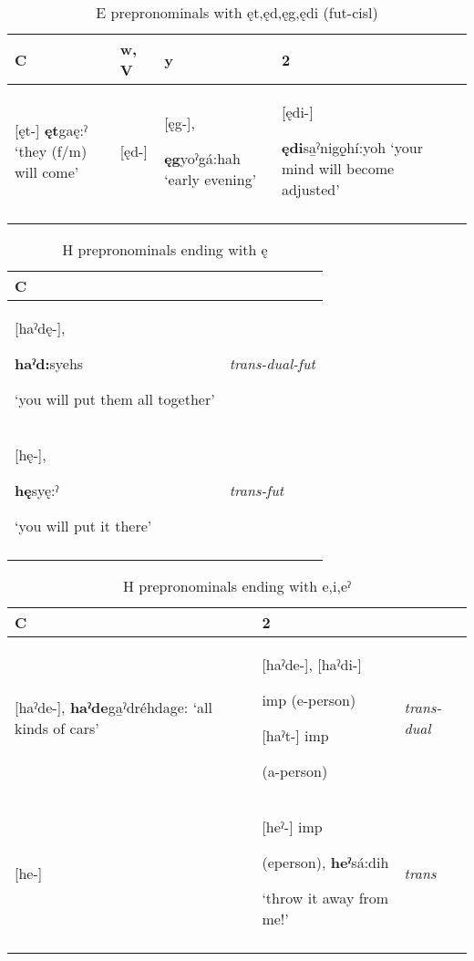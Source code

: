 \lipsum[1-1]


\begin{table}
\caption{E prepronominals with ęt,ęd,ęg,ędi (fut-cisl)}
\label{tab:1:eprepronfutcisl}
\scriptsize{
\begin{tabularx}{\textwidth}{XXXXX}
\lsptoprule
C & w, V & y & 2\\
\midrule
{}[ęt-] \textbf{ęt}gaę:ˀ ‘they (f/m) will come’ & [ęd-] & [ęg-], 

\textbf{ęg}yoˀgá:hah ‘early evening’ & [ędi-] 

\textbf{ędi}sa̱ˀnigǫ̱hí:yoh ‘your mind will become adjusted’\\
\lspbottomrule
\end{tabularx}}
\end{table}



\begin{table}
\caption{H prepronominals ending with ę}
\label{tab:1:transdualfut}
\scriptsize{
\begin{tabularx}{\textwidth}{XX}
\lsptoprule
C & \\
\midrule
{}[haˀdę-], 

\textbf{haˀd\’{ę}:}syehs 

‘you will put them all together’ & {\itshape trans-dual-fut}\\

{}[hę-], 

\textbf{hę}syę:ˀ 

‘you will put it there’ & {\itshape trans-fut}\\
\lspbottomrule
\end{tabularx}}
\end{table}



\begin{table}
\caption{H prepronominals ending with e,i,eˀ}
\label{tab:1:epreprontrans}
\scriptsize{
\begin{tabularx}{\textwidth}{XXX}
\lsptoprule
C & 2\\
\midrule
{}[haˀde-], \textbf{haˀde}ga̱ˀdréhdage: ‘all kinds of cars’ & [haˀde-], [haˀdi-]

imp (e-person) 

{}[haˀt-] imp 

(a-person) & {\itshape trans-dual}\\

{}[he-] & [heˀ-] imp 

(eperson), \textbf{heˀ}sá:dih 

‘throw it away from me!’ & {\itshape trans}\\
\lspbottomrule
\end{tabularx}}
\end{table}

